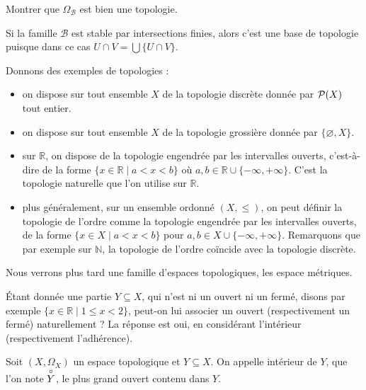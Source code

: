\begin{exercise}
  Montrer que $\Omega_{\mathcal B}$ est bien une topologie.
\end{exercise}

\begin{remark}
  Si la famille $\mathcal B$ est stable par intersections finies, alors c'est
  une base de topologie puisque dans ce cas $U \cap V = \bigcup \{U \cap V\}$.
\end{remark}

\begin{example}
  Donnons des exemples de topologies :
  \begin{itemize}
  \item on dispose sur tout ensemble $X$ de la topologie discrète donnée par
    $\mathcal{P}(X)$ tout entier.
  \item on dispose sur tout ensemble $X$ de la topologie grossière donnée
    par $\{\varnothing,X\}$.
  \item sur $\mathbb R$, on dispose de la topologie engendrée par les
    intervalles ouverts, c'est-à-dire de la forme
    $\{x \in \mathbb R \mid a < x < b\}$ où
    $a,b\in\mathbb R\cup\{-\infty,+\infty\}$. C'est la topologie naturelle que
    l'on utilise sur $\mathbb R$.
  \item plus généralement, sur un ensemble ordonné $(X,\leq)$, on peut définir
    la topologie de l'ordre comme la topologie engendrée par les intervalles
    ouverts, de la forme $\{x\in X\mid a < x < b\}$ pour
    $a,b\in X\cup\{-\infty,+\infty\}$. Remarquons que par exemple sur
    $\mathbb N$, la topologie de l'ordre coïncide avec la topologie discrète.
  \end{itemize}
\end{example}

Nous verrons plus tard une famille d'espaces topologiques, les espace métriques.

\'Etant donnée une partie $Y\subseteq X$, qui n'est ni un ouvert ni un fermé,
disons par exemple $\{x\in\mathbb R\mid 1 \leq x < 2\}$, peut-on lui associer
un ouvert (respectivement un fermé) naturellement ? La réponse est oui, en
considérant l'intérieur (respectivement l'adhérence).

\begin{definition}[Intérieur]
  Soit $(X,\Omega_X)$ un espace topologique et $Y\subseteq X$. On appelle
  intérieur de $Y$, que l'on note $\overset{\circ}{Y}$, le plus grand ouvert contenu dans
  $Y$.
\end{definition}

